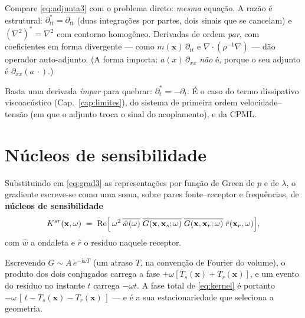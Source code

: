 \documentclass[11pt,a4paper,oneside]{report}
\begin{document}
\begin{teoria}
Compare \eqref{eq:adjunta3} com o problema direto: \emph{mesma} equa\c{c}\~ao.
A raz\~ao \'e estrutural: $\partial_{tt}^{*} = \partial_{tt}$ (duas
integra\c{c}\~oes por partes, dois sinais que se cancelam) e
$(\nabla^{2})^{*} = \nabla^{2}$ com contorno homog\^eneo. Derivadas de ordem
\emph{par}, com coeficientes em forma divergente --- como $m(\mathbf{x})\,
\partial_{tt}$ e $\nabla\!\cdot\!(\rho^{-1}\nabla)$ --- d\~ao operador
auto-adjunto. (A forma importa: $a(x)\,\partial_{xx}$ \emph{n\~ao} \'e, porque o
seu adjunto \'e $\partial_{xx}(a\,\cdot)$.)

Basta uma derivada \emph{\'impar} para quebrar: $\partial_t^{*} =
-\partial_t$. \'E o caso do termo dissipativo viscoac\'ustico
(Cap.~\ref{cap:limites}), do sistema de primeira ordem velocidade--tens\~ao (em
que o adjunto troca o sinal do acoplamento), e da CPML.
\end{teoria}

\section{N\'ucleos de sensibilidade}

Substituindo em \eqref{eq:grad3} as representa\c{c}\~oes por fun\c{c}\~ao de
Green de $p$ e de $\lambda$, o gradiente escreve-se como uma soma, sobre pares
fonte--receptor e frequ\^encias, de \textbf{n\'ucleos de sensibilidade}
\begin{equation}
K^{sr}(\mathbf{x},\omega) \;=\; \operatorname{Re}\Bigl[\,\omega^{2}\,
 \overline{\hat w(\omega)}\;
 \overline{G(\mathbf{x},\mathbf{x}_s;\omega)}\;
 \overline{G(\mathbf{x},\mathbf{x}_r;\omega)}\;
 \hat r(\mathbf{x}_r,\omega)\Bigr],
\label{eq:kernel}
\end{equation}
com $\hat w$ a ondaleta e $\hat r$ o res\'iduo naquele receptor.

Escrevendo $G \sim A\,e^{-\mathrm{i}\omega T}$ (um atraso $T$, na
conven\c{c}\~ao de Fourier do volume), o produto dos dois conjugados carrega a
fase $+\omega[T_s(\mathbf{x}) + T_r(\mathbf{x})]$, e um evento do res\'iduo no
instante $t$ carrega $-\omega t$. A fase total de \eqref{eq:kernel} \'e
portanto $-\omega\,[\,t - T_s(\mathbf{x}) - T_r(\mathbf{x})\,]$ --- e \'e a sua
estacionariedade que seleciona a geometria.
\end{document}
